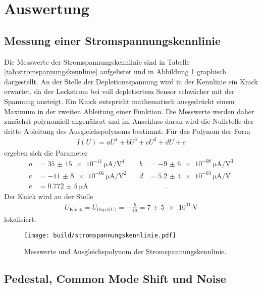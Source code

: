 \section{Auswertung}
\label{sec:Auswertung}

\subsection{Messung einer Stromspannungskennlinie}

Die Messwerte der Stromspannungskennlinie sind in Tabelle \ref{tab:stromspannungskennlinie} aufgelistet
und in Abbildung \ref{fig:stromspannungskennlinie} graphisch dargestellt. An der Stelle der Depletionsspannung
wird in der Kennlinie ein Knick erwartet, da der Leckstrom bei voll depletiertem Sensor schwächer mit der Spannung
ansteigt. Ein Knick entspricht mathematisch ausgedrückt einem Maximum in der zweiten Ableitung einer Funktion.
Die Messwerte werden daher zunächst polynomiell angenähert und im Anschluss daran wird die Nullstelle der dritte Ableitung des
Ausgleichspolynoms bestimmt. Für das Polynom der Form
\begin{align}
  I(U) = a U^4 + b U^3 + c U^2 + d U + e
\end{align}
ergeben sich die Parameter
\begin{align*}
  a &= \SI{35(15)e-11}{\micro\ampere\per\volt\tothe{4}} &\quad b &= \SI{-9(6)e-08}{\micro\ampere\per\volt\tothe{3}} \\
  c&= \SI{-11(8)e-06}{\micro\ampere\per\volt\tothe{2}} &\quad d &= \SI{5,2(4)e-03}{\micro\ampere\per\volt} \\
  e &= \SI{0,772(5)}{\micro\ampere} &\quad \phantom{f}&\phantom{=10}.
\end{align*}
Der Knick wird an der Stelle
\begin{align}
  U_\text{Knick} = U_\text{Dep,I(U)} = -\frac{b}{4a} = \SI{7(5)e01}{\volt}
\end{align}
lokalisiert.

\begin{figure}
  \centering
  \texttt{[image: build/stromspannungskennlinie.pdf]}
  \caption{Messwerte und Ausgleichspolynom der Stromspannungskennlinie.}
  \label{fig:stromspannungskennlinie}
\end{figure}

\subsection{Pedestal, Common Mode Shift und Noise}

